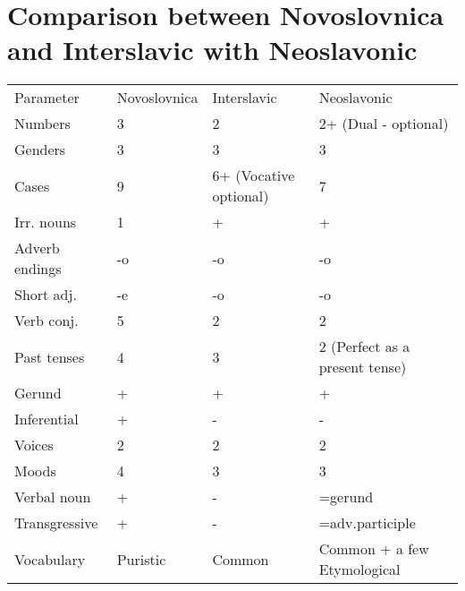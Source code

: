 \section{Comparison between Novoslovnica and Interslavic with Neoslavonic}

\begin{table}[h]
	\begin{tabular}{llll}
		Parameter & Novoslovnica & Interslavic & Neoslavonic \\
		Numbers & 3 & 2 & 2+ (Dual - optional) \\
		Genders & 3 & 3 & 3 \\
		Cases & 9 & 6+ (Vocative optional) & 7 \\
		Irr. nouns & 1 & + & + \\
		Adverb endings & -o & -o & -o \\
		Short adj. & -e & -o & -o \\
		Verb conj. & 5 & 2 & 2 \\
		Past tenses & 4 & 3 & 2 (Perfect as a present tense)\\
		Gerund & + & + & + \\
		Inferential & + & - & - \\
		Voices & 2 & 2 & 2 \\
		Moods & 4 & 3 & 3 \\
		Verbal noun & + & - & =gerund \\
		Transgressive & + & - & =adv.participle \\
		Vocabulary & Puristic & Common & Common + a few Etymological 
	\end{tabular}
\end{table}